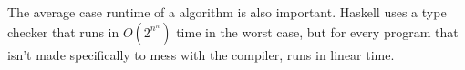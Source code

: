 
The average case runtime of a algorithm is also important. Haskell uses a type
checker that runs in $O(2^{n^n})$ time in the worst case, but for every program
that isn't made specifically to mess with the compiler, runs in linear time.

